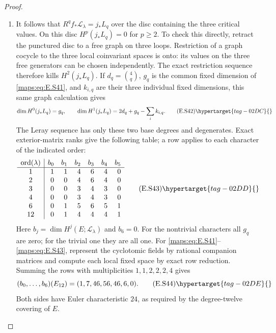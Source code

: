 \begin{proof}
\begin{enumerate}[label={$\langle1\rangle$\arabic*.},leftmargin=*]
\item It follows that $R^q f_*\mathcal L_\lambda=j_*L_q$ over
the disc containing the three critical values. On this
disc $H^p(j_*L_q)=0$ for $p\geq2$. To check this directly,
retract the punctured disc to a free graph on three loops.
Restriction of a graph cocycle to the three local
coinvariant spaces is onto: its values on the three free
generators can be chosen independently. The exact
restriction sequence therefore kills $H^2(j_*L_q)$.
If $d_q=\binom4q$, $g_q$ is the common fixed dimension of
\eqref{maps:eq:E.S41}, and $k_{i,q}$ are their three individual fixed
dimensions, this same graph calculation gives
\[
 \dim H^0(j_*L_q)=g_q,\qquad
 \dim H^1(j_*L_q)=2d_q+g_q-\sum_i k_{i,q}.
 \tag{E.S42}\hypertarget{tag-02DC}{}\label{maps:eq:E.S42}
\]
The Leray sequence has only these two base degrees and
degenerates. Exact exterior-matrix ranks give the following
table; a row applies to each character of the indicated
order:
\[
 \begin{array}{c|rrrrrr}
 \operatorname{ord}(\lambda)&b_0&b_1&b_2&b_3&b_4&b_5\\ \hline
 1 &1&1&4&6&4&0\\
 2 &0&0&4&6&4&0\\
 3 &0&0&3&4&3&0\\
 4 &0&0&3&4&3&0\\
 6 &0&1&5&6&5&1\\
 12&0&1&4&4&4&1
 \end{array}
 \tag{E.S43}\hypertarget{tag-02DD}{}\label{maps:eq:E.S43}
\]
Here $b_j=\dim H^j(E;\mathcal L_\lambda)$ and $b_6=0$.
For the nontrivial characters all $g_q$ are zero; for the
trivial one they are all one. For \eqref{maps:eq:E.S41}--\eqref{maps:eq:E.S43}, represent the
cyclotomic fields by rational companion matrices and compute each local
fixed space by exact row reduction.
Summing the rows with multiplicities $1,1,2,2,2,4$ gives
\[
             (b_0,\ldots,b_6)(E_{12})=(1,7,46,56,46,6,0).
 \tag{E.S44}\hypertarget{tag-02DE}{}\label{maps:eq:E.S44}
\]
Both sides have Euler characteristic $24$, as required by
the degree-twelve covering of $E$.


\end{enumerate}
\end{proof}
